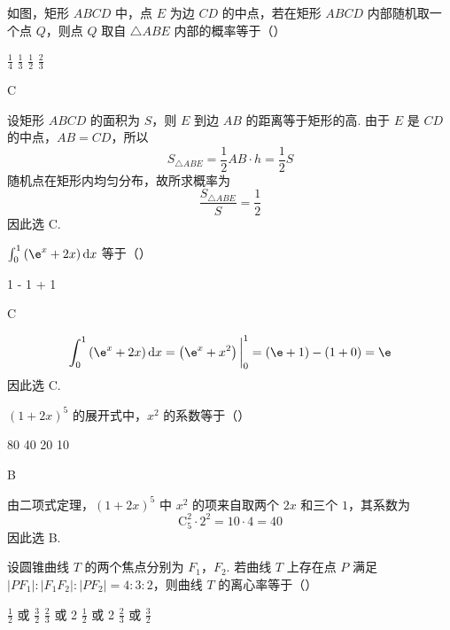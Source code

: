\begin{problem}
如图，矩形 \(ABCD\) 中，点 \(E\) 为边 \(CD\) 的中点，若在矩形 \(ABCD\) 内部随机取一个点 \(Q\)，则点 \(Q\) 取自 \(\triangle ABE\) 内部的概率等于（\quad）


\choices
    {\( \frac{1}{4} \)}
    {\( \frac{1}{3} \)}
    {\( \frac{1}{2} \)}
    {\( \frac{2}{3} \)}
\end{problem}

\begin{answer}
C
\end{answer}

\begin{solution}
设矩形 \(ABCD\) 的面积为 \(S\)，则 \(E\) 到边 \(AB\) 的距离等于矩形的高. 由于 \(E\) 是 \(CD\) 的中点，\(AB=CD\)，所以
\[
S_{\triangle ABE}=\frac{1}{2}AB\cdot h=\frac{1}{2}S
\]
随机点在矩形内均匀分布，故所求概率为
\[
\frac{S_{\triangle ABE}}{S}=\frac{1}{2}
\]
因此选 C.
\end{solution}

\begin{problem}
\(\int_{0}^{1}\left(\e^{x} + 2x\right)\mathrm{d}x\) 等于（\quad）

\choices
    {1}
    {\e - 1}
    {\e}
    {\e + 1}
\end{problem}

\begin{answer}
C
\end{answer}

\begin{solution}
\[
\int_0^1\left(\e^x+2x\right)\mathrm{d}x=\left(\e^x+x^2\right)\bigg|_0^1=(\e+1)-(1+0)=\e
\]
因此选 C.
\end{solution}

\begin{problem}
\((1 + 2x)^{5}\) 的展开式中，\(x^{2}\) 的系数等于（\quad）

\choices
    {80}
    {40}
    {20}
    {10}
\end{problem}

\begin{answer}
B
\end{answer}

\begin{solution}
由二项式定理，\((1+2x)^5\) 中 \(x^2\) 的项来自取两个 \(2x\) 和三个 \(1\)，其系数为
\[
\mathrm C_5^2\cdot 2^2=10\cdot4=40
\]
因此选 B.
\end{solution}

\begin{problem}
设圆锥曲线 \(T\) 的两个焦点分别为 \(F_{1}\)，\(F_{2}\). 若曲线 \(T\) 上存在点 \(P\) 满足 \(|PF_{1}|: |F_{1}F_{2}|: |PF_{2}| = 4:3:2\)，则曲线 \(T\) 的离心率等于（\quad）

\choices
    {\(\frac{1}{2}\) 或 \(\frac{3}{2}\)}
    {\(\frac{2}{3}\) 或 2}
    {\(\frac{1}{2}\) 或 2}
    {\(\frac{2}{3}\) 或 \(\frac{3}{2}\)}
\end{problem}

